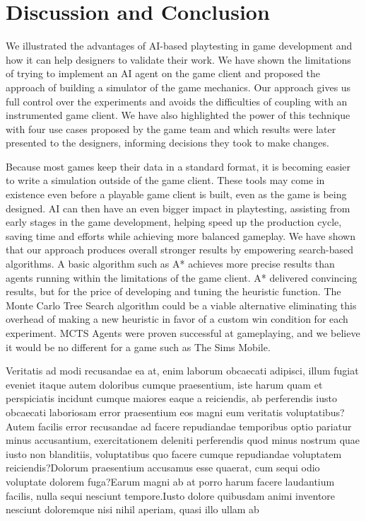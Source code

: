 \documentclass[letterpaper]{article} %
\begin{document}
\vspace{-1.66mm}
\section{Discussion and Conclusion}

We illustrated the advantages of AI-based playtesting in game development and how it can help designers to validate their work. We have shown the limitations of trying to implement an AI agent on the game client and proposed the approach of building a simulator of the game mechanics. Our approach gives us full control over the experiments and avoids the difficulties of coupling with an instrumented game client. We have also highlighted the power of this technique with four use cases proposed by the game team and which results were later presented to the designers, informing decisions they took to make changes.

Because most games keep their data in a standard format, it is becoming easier to write a simulation outside of the game client. These tools may come in existence even before a playable game client is built, even as the game is being designed. AI can then have an even bigger impact in playtesting, assisting from early stages in the game development, helping speed up the production cycle, saving time and efforts while achieving more balanced gameplay.  We have shown that our approach produces overall stronger results by empowering search-based algorithms. A basic algorithm such as A* achieves more precise results than agents running within the limitations of the game client.  A* delivered convincing results, but for the price of developing and tuning the heuristic function. The Monte Carlo Tree Search algorithm could be a viable alternative eliminating this overhead of making a new heuristic in favor of a custom win condition for each experiment. MCTS Agents were proven successful at gameplaying, and we believe it would be no different for a game such as The Sims Mobile.

Veritatis ad modi recusandae ea at, enim laborum obcaecati adipisci, illum fugiat eveniet itaque autem doloribus cumque praesentium, iste harum quam et perspiciatis incidunt cumque maiores eaque a reiciendis, ab perferendis iusto obcaecati laboriosam error praesentium eos magni eum veritatis voluptatibus?Autem facilis error recusandae ad facere repudiandae temporibus optio pariatur minus accusantium, exercitationem deleniti perferendis quod minus nostrum quae iusto non blanditiis, voluptatibus quo facere cumque repudiandae voluptatem reiciendis?Dolorum praesentium accusamus esse quaerat, cum sequi odio voluptate dolorem fuga?Earum magni ab at porro harum facere laudantium facilis, nulla sequi nesciunt tempore.Iusto dolore quibusdam animi inventore nesciunt doloremque nisi nihil aperiam, quasi illo ullam ab


\end{document}
